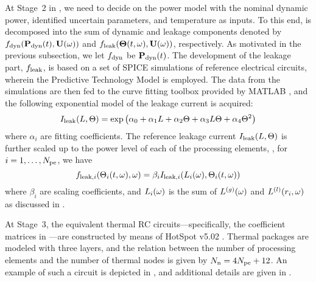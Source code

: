At Stage~2 in , we need to decide on the power model with the nominal dynamic power, identified uncertain parameters, and temperature as inputs. To this end,  is decomposed into the sum of dynamic and leakage components denoted by $f_{\text{dyn}}(\mathbf{P}_{\text{dyn}}(t), \mathbf{U}(\omega))$ and $f_{\text{leak}}({\boldsymbol\Theta}(t, \omega), \mathbf{U}(\omega))$, respectively. As motivated in the previous subsection, we let $f_{\text{dyn}}$ be $\mathbf{P}_{\text{dyn}}(t)$. The development of the leakage part, $f_{\text{leak}}$, is based on a set of SPICE simulations of reference electrical circuits, wherein the Predictive Technology Model \cite{ptm} is employed. The data from the simulations are then fed to the curve fitting toolbox provided by MATLAB \cite{matlab}, and the following exponential model of the leakage current is acquired:
\begin{equation} \elabel{leakage-current}
  I_\leak(\Leff, \T) = \exp \left( \alpha_0 + \alpha_1 \Leff + \alpha_2 \T + \alpha_3 \Leff \T + \alpha_4 \T^2 \right)
\end{equation}
where $\alpha_i$ are fitting coefficients. The reference leakage current $I_{\text{leak}}(L, \Theta)$ is further scaled up to the power level of each of the processing elements, \ie, for $i = 1, \dotsc, {N_\text{pe}}$, we have
\[
  f_{\text{leak}, i}(\Theta_i(t, \omega), \omega) = \beta_i I_{\text{leak}, i}(L_i(\omega), \Theta_i(t, \omega))
\]
where $\beta_i$ are scaling coefficients, and $L_i(\omega)$ is the sum of ${L^{(g)}}(\omega)$ and $L^{(l)}(r_i, \omega)$ as discussed in .

At Stage~3, the equivalent thermal RC circuits---specifically, the coefficient matrices in ---are constructed by means of HotSpot v5.02 \cite{hotspot}. Thermal packages are modeled with three layers, and the relation between the number of processing elements and the number of thermal nodes is given by $N_\text{n} = 4 {N_\text{pe}} + 12$. An example of such a circuit is depicted in , and additional details are given in .
